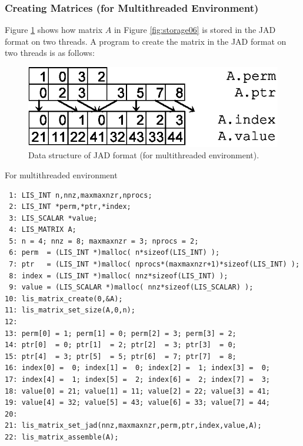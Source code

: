 \documentclass[a4paper]{article}
\begin{document}
\newpage
\subsubsection{Creating Matrices (for Multithreaded Environment)}
Figure \ref{fig:storage06_omp} shows how matrix $A$ in Figure \ref{fig:storage06} is stored in the JAD format on two threads. A program to create the matrix in the JAD format on two threads is as follows:
\begin{figure}[h]
{\centering 
\includegraphics{storage06_omp.eps} 
\caption{Data structure of JAD format (for multithreaded environment).}\label{fig:storage06_omp}}
\end{figure}
\begin{itemsquarebox}[l]{For multithreaded environment}
\small
\begin{verbatim}
 1: LIS_INT n,nnz,maxmaxnzr,nprocs;
 2: LIS_INT *perm,*ptr,*index;
 3: LIS_SCALAR *value;
 4: LIS_MATRIX A;
 5: n = 4; nnz = 8; maxmaxnzr = 3; nprocs = 2;
 6: perm  = (LIS_INT *)malloc( n*sizeof(LIS_INT) );
 7: ptr   = (LIS_INT *)malloc( nprocs*(maxmaxnzr+1)*sizeof(LIS_INT) );
 8: index = (LIS_INT *)malloc( nnz*sizeof(LIS_INT) );
 9: value = (LIS_SCALAR *)malloc( nnz*sizeof(LIS_SCALAR) );
10: lis_matrix_create(0,&A);
11: lis_matrix_set_size(A,0,n);
12:
13: perm[0] = 1; perm[1] = 0; perm[2] = 3; perm[3] = 2;
14: ptr[0]  = 0; ptr[1]  = 2; ptr[2]  = 3; ptr[3]  = 0;
15: ptr[4]  = 3; ptr[5]  = 5; ptr[6]  = 7; ptr[7]  = 8;
16: index[0] =  0; index[1] =  0; index[2] =  1; index[3] =  0;
17: index[4] =  1; index[5] =  2; index[6] =  2; index[7] =  3;
18: value[0] = 21; value[1] = 11; value[2] = 22; value[3] = 41;
19: value[4] = 32; value[5] = 43; value[6] = 33; value[7] = 44;
20:
21: lis_matrix_set_jad(nnz,maxmaxnzr,perm,ptr,index,value,A);
22: lis_matrix_assemble(A);
\end{verbatim}
\end{itemsquarebox}

\newpage
\end{document}
